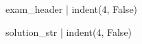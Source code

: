 \documentclass[12pt,a4paper,notitlepage]{article}
\begin{document}
    {{ exam_header | indent(4, False)}}

    {{ solution_str | indent(4, False)}}
\end{document}
